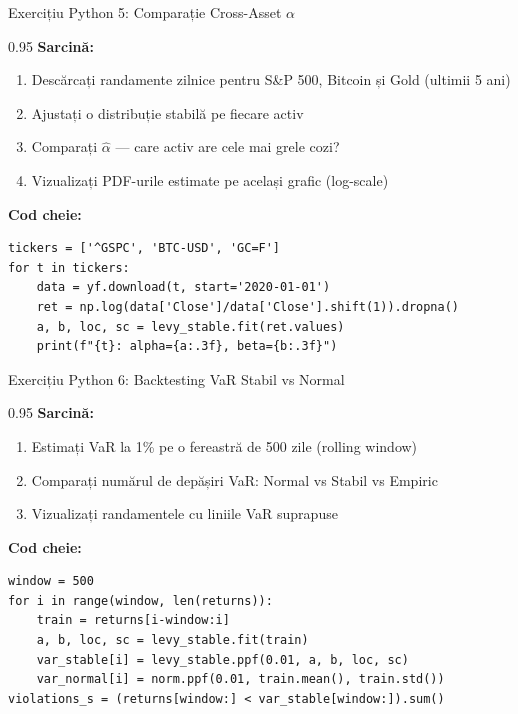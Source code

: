 \documentclass[9pt, aspectratio=169, t]{beamer}
\begin{document}
\begin{frame}[fragile]{Exercițiu Python 5: Comparație Cross-Asset $\alpha$}
    \begin{cminipage}{0.95\textwidth}
    \textbf{Sarcină:}
    \begin{enumerate}\setlength{\itemsep}{0pt}
        \item Descărcați randamente zilnice pentru S\&P 500, Bitcoin și Gold (ultimii 5 ani)
        \item Ajustați o distribuție stabilă pe fiecare activ
        \item Comparați $\hat{\alpha}$ --- care activ are cele mai grele cozi?
        \item Vizualizați PDF-urile estimate pe același grafic (log-scale)
    \end{enumerate}

    \vspace{0.2cm}
    \textbf{Cod cheie:}
\begin{lstlisting}[basicstyle=\ttfamily\scriptsize]
tickers = ['^GSPC', 'BTC-USD', 'GC=F']
for t in tickers:
    data = yf.download(t, start='2020-01-01')
    ret = np.log(data['Close']/data['Close'].shift(1)).dropna()
    a, b, loc, sc = levy_stable.fit(ret.values)
    print(f"{t}: alpha={a:.3f}, beta={b:.3f}")
\end{lstlisting}

    \end{cminipage}
\end{frame}

\begin{frame}[fragile]{Exercițiu Python 6: Backtesting VaR Stabil vs Normal}
    \begin{cminipage}{0.95\textwidth}
    \textbf{Sarcină:}
    \begin{enumerate}\setlength{\itemsep}{0pt}
        \item Estimați VaR la 1\% pe o fereastră de 500 zile (rolling window)
        \item Comparați numărul de depășiri VaR: Normal vs Stabil vs Empiric
        \item Vizualizați randamentele cu liniile VaR suprapuse
    \end{enumerate}

    \vspace{0.2cm}
    \textbf{Cod cheie:}
\begin{lstlisting}[basicstyle=\ttfamily\scriptsize]
window = 500
for i in range(window, len(returns)):
    train = returns[i-window:i]
    a, b, loc, sc = levy_stable.fit(train)
    var_stable[i] = levy_stable.ppf(0.01, a, b, loc, sc)
    var_normal[i] = norm.ppf(0.01, train.mean(), train.std())
violations_s = (returns[window:] < var_stable[window:]).sum()
\end{lstlisting}

    \end{cminipage}
\end{frame}
\end{document}
